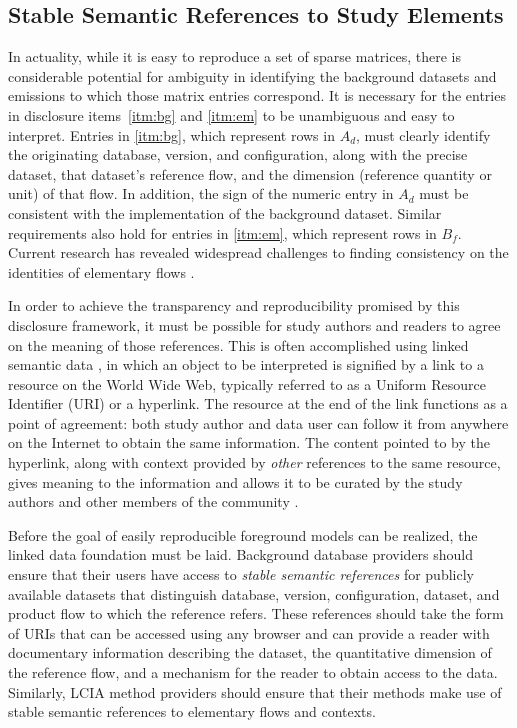 \subsection{Stable Semantic References to Study Elements}

In actuality, while it is easy to reproduce a set of sparse matrices, there is considerable potential for ambiguity
in identifying the background datasets and emissions to which those matrix entries correspond.
It is necessary for the entries in disclosure items~\ref{itm:bg} and \ref{itm:em} to be unambiguous and easy to interpret.  Entries in \ref{itm:bg}, which represent rows in $A_d$, must clearly identify the originating database, version, and configuration, along with the precise dataset, that dataset's reference flow, and the dimension (reference quantity or unit) of that flow.  In addition, the sign of the numeric entry in $A_d$ must be consistent with the implementation of the background dataset.  Similar requirements also hold for entries in \ref{itm:em}, which represent rows in $B_f$.  Current research has revealed widespread challenges to finding consistency on the identities of elementary flows \citep{Edelen_2017}.

In order to achieve the transparency and reproducibility promised by this disclosure framework, it must be possible for study authors and readers to agree on the meaning of those references.  This is often accomplished using linked semantic data \citep{Bizer_2009}, in which an object to be interpreted is signified by a link to a resource on the World Wide Web, typically referred to as a Uniform Resource Identifier (URI) or a hyperlink.  The resource at the end of the link functions as a point of agreement: both study author and data user can follow it from anywhere on the Internet to obtain the same information.  The content pointed to by the hyperlink, along with context provided by \emph{other} references to the same resource, gives meaning to the information and allows it to be curated by the study authors and other members of the community \citep{Khan_2011}.   %

Before the goal of easily reproducible foreground models can be realized, the linked data foundation must be laid.  Background database providers should ensure that their users have access to \emph{stable semantic references} for publicly available datasets that distinguish database, version, configuration, dataset, and product flow to which the reference refers.  These references should take the form of URIs that can be accessed using any browser and can provide a reader with documentary information describing the dataset, the quantitative dimension of the reference flow, and a mechanism for the reader to obtain access to the data.  Similarly, LCIA method providers should ensure that their methods make use of stable semantic references to elementary flows and contexts.
